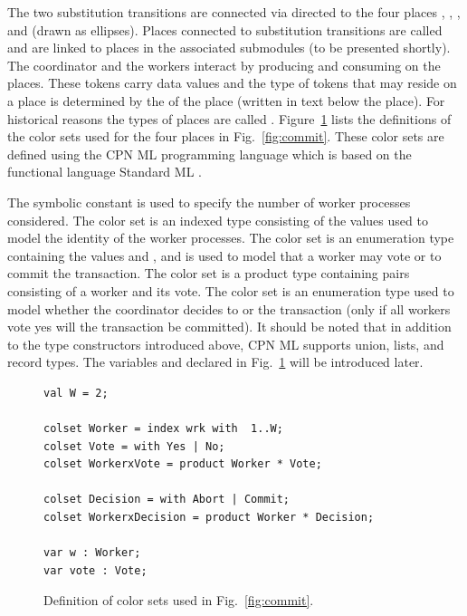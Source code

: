 The two substitution transitions are connected via directed
 to the four places ,
, , and  (drawn
as ellipses). Places connected to substitution transitions are called
 and are linked to  places in the
associated submodules (to be presented shortly). The coordinator and
the workers interact by producing and consuming  on
the places. These tokens carry data values and the type of tokens that
may reside on a place is determined by the  of the place
(written in text below the place). For historical reasons the types of
places are called . Figure~\ref{fig:coloursets}
lists the definitions of the color sets used for the four places in
Fig.~\ref{fig:commit}. These color sets are defined using the CPN ML
programming language which is based on the functional language
Standard ML \cite{sml}.

The symbolic constant  is used to specify the number of
worker processes considered. The  color set is an
indexed type consisting of the values
 used to model the identity of the
worker processes. The color set  is an enumeration type
containing the values  and , and is used to
model that a worker may vote  or  to commit
the transaction. The color set  is a product type
containing pairs consisting of a worker and its vote. The color set
 is an enumeration type used to model whether the
coordinator decides to  or  the
transaction (only if all workers vote yes will the transaction be
committed). It should be noted that in addition to the type
constructors introduced above, CPN ML supports union, lists, and
record types. The variables  and  declared in
Fig.~\ref{fig:coloursets} will be introduced later.

\begin{figure}[]
\begin{verbatim}
val W = 2;

colset Worker = index wrk with  1..W;
colset Vote = with Yes | No;
colset WorkerxVote = product Worker * Vote;

colset Decision = with Abort | Commit;
colset WorkerxDecision = product Worker * Decision;

var w : Worker;
var vote : Vote;
\end{verbatim}
\caption{Definition of color sets used in Fig.~\ref{fig:commit}.}
\label{fig:coloursets}
\end{figure}



